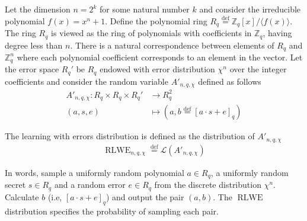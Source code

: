 Let the dimension $n = 2^k$ for some natural number $k$ and consider the irreducible polynomial $f(x) = x^n + 1$. Define the polynomial ring $R_q \stackrel{\mathrm{def}}{=} \mathbb{Z}_q[x] /\langle f(x)\rangle$. The ring $R_q$ is viewed as the ring of polynomials with coefficients in $\mathbb{Z}_q$, having degree less than $n$. There is a natural correspondence between elements of $R_q$ and $\mathbb{Z}_q^n$ where each polynomial coefficient corresponds to an element in the vector. Let the error space $R_q'$ be $R_q$ endowed with error distribution $\chi^n$ over the integer coefficients and consider the random variable $A'_{n, q, \chi}$ defined as follows
\begin{equation*}
\begin{aligned}
    A'_{n, q, \chi} \colon R_q \times R_q \times R_q' &\to R_q^2\\
    (a,s,e) &\mapsto (a, b \stackrel{\mathrm{def}}{=} [a \cdot s + e]_q)
\end{aligned}
\end{equation*}
\begin{definition}
    The learning with errors distribution is defined as the distribution of $A'_{n, q, \chi}$
    \begin{equation*}
    \begin{aligned}
        \operatorname{RLWE}_{n, q, \chi} \stackrel{\mathrm{def}}{=} \mathcal{L}(A'_{n, q, \chi})
    \end{aligned}
    \end{equation*}
\end{definition}
In words, sample a uniformly random polynomial $a \in R_q$, a uniformly random secret $s \in R_q$ and a random error $e \in R_q$ from the discrete distribution $\chi^n$. Calculate $b$ (i.e, $[a \cdot s + e]_q$) and output the pair $(a,b)$. The $\operatorname{RLWE}$ distribution specifies the probability of sampling each pair.

